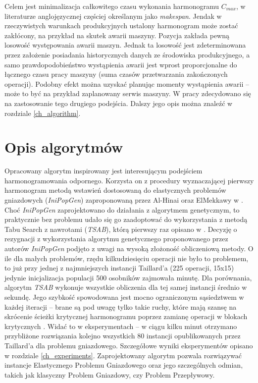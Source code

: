 \documentclass[printmode,oneside]{mgr}
\begin{document}
Celem jest minimalizacja całkowitego czasu wykonania harmonogramu $C_{max}$, w literaturze anglojęzycznej częściej określanym jako \emph{makespan}. Jendak w rzeczywistych warunkach produkcyjnych ustalony harmonogram może zostać zakłócony, na przykład na skutek awarii maszyny. Pozycja \cite{RFJSRMB_ElMekkawy11} zakłada pewną losowość występowania awarii maszyn. Jednak ta losowość jest zdeterminowana przez założenie posiadania historycznych danych ze środowiska produkcyjnego, a samo prawdopodobieństwo wystąpienia awarii jest wprost proporcjonalne do łącznego czasu pracy maszyny (suma czasów przetwarzania zakończonych operacji). Podobny efekt można uzyskać planując momenty wystąpienia awarii -- może to być na przykład zaplanowany serwis maszyny. W pracy zdecydowano się na zastosowanie tego drugiego podejścia. Dalszy jego opis można znaleźć w rozdziale \ref{ch_algorithm}.
%
\chapter{Opis algorytmów \label{ch_algorithm}}
Opracowany algorytm inspirowany jest interesującym podejściem harmonogramowania odpornego. Korzysta on z procedury wyznaczającej pierwszy harmonogram metodą wstawień dostosowaną do elastycznych problemów gniazdowych (\emph{IniPopGen}) zaproponowaną przez Al-Hinai oraz ElMekkawy w \cite{AEHGAFJS_ElMekkawy11}. Choć \emph{IniPopGen} zaprojektowano do działania z algorytmem genetycznym, to praktycznie bez problemu udało się go zaadoptować do wykorzystania z metodą Tabu Search z nawrotami (\emph{TSAB}), którą pierwszy raz opisano w \cite{Smutnicki96}. Decyzję o rezygnacji z wykorzystania algorytmu genetycznego proponowanego przez autorów \emph{IniPopGen} podjęto z uwagi na wysoką złożoność obliczeniową metody. O ile dla małych problemów, rzędu kilkudziesięciu operacji nie było to problemem, to już przy jednej z najmniejszych instancji Taillard'a (225 operacji, 15x15) jedynie inicjalizacja populacji 500 osobników zajmowała minutę. Dla porównania, algorytm \emph{TSAB} wykonuje wszystkie obliczenia dla tej samej instancji średnio w sekundę. Jego szybkość spowodowana jest mocno ograniczonym sąsiedztwem w każdej iteracji -- brane są pod uwagę tylko takie ruchy, które mają szansę na skrócenie ścieżki krytycznej harmonogramu poprzez zamianę operacji w blokach krytycznych \cite{Grabowski86}. Widać to w eksperymentach -- w ciągu kilku minut otrzymano przybliżone rozwiązania kolejno wszystkich 80 instancji opublikowanych przez Taillard'a dla problemu gniazdowego. Szczegółowe wyniki eksperymentów opisano w rozdziale \ref{ch_experiments}. Zaprojektowany algorytm pozwala rozwiązywać instancje Elastycznego Problemu Gniazdowego oraz jego szczególnych odmian, takich jak klasyczny Problem Gniazdowy, czy Problem Przepływowy.
%
\end{document}
